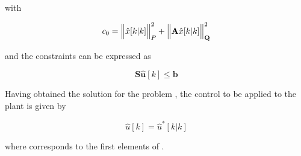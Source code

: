 \noindent
with

\noindent
\begin{equation}
    c_0 = \Big\Vert \hat{x}[k|k]  \Big\Vert^2_{P} + \Big\Vert \mathbf{A} \hat{x}[k|k]  \Big\Vert^2_{\mathbf{Q}} 
    \nonumber
\end{equation}

\noindent
and the constraints can be expressed as

\noindent
\begin{equation}
    \label{cap3-constraint}
    \mathbf{S} \mathbf{\hat{u}}[k] \leq \mathbf{b}
\end{equation}

Having obtained the solution  for the problem 
, the control to be applied to the plant is given by

\noindent
\begin{equation}
    \hat{u}[k] = \hat{u}^*[k|k]
    \nonumber
\end{equation}

\noindent
where  corresponds to the first  elements of .
